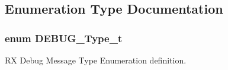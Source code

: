 \subsection{Enumeration Type Documentation}
\subsubsection[{\texorpdfstring{D\+E\+B\+U\+G\+\_\+\+Type\+\_\+t}{DEBUG_Type_t}}]{\setlength{\rightskip}{0pt plus 5cm}enum {\bf D\+E\+B\+U\+G\+\_\+\+Type\+\_\+t}}\hypertarget{group___debug___exported___types_gacb1775677105967978fae4d9155cca26}{}\label{group___debug___exported___types_gacb1775677105967978fae4d9155cca26}


RX Debug Message Type Enumeration definition. 

